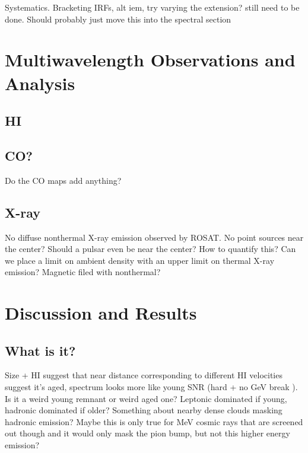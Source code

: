 Systematics. Bracketing IRFs, alt iem, try varying the extension? still need to be done. Should probably just move this into the spectral  section


%
%

\section{\label{sec:Multiwave}Multiwavelength  Observations and  Analysis }
\subsection{\label{sec:HI}HI}
\subsection{\label{sec:CO}CO?}
Do the CO maps add anything?
\subsection{\label{sec:Xray}X-ray}
No diffuse nonthermal X-ray emission observed by ROSAT. No point sources near the center? Should a  pulsar even  be near the center? How to quantify this? Can we place a limit on ambient density with an upper limit on thermal X-ray emission? Magnetic filed with nonthermal?

%
%
\section{\label{sec:Discuss}Discussion and Results}
\subsection{\label{sec:What}What is it?}
Size + HI suggest that near distance corresponding to different HI velocities suggest it's aged, spectrum looks more like young SNR (hard + no GeV break ). Is it a weird young remnant or weird aged one? Leptonic dominated if young, hadronic dominated if older? Something about nearby dense clouds masking hadronic emission? Maybe this is only true for MeV cosmic rays that are screened out though and it would only mask the pion bump, but not this higher energy emission?

